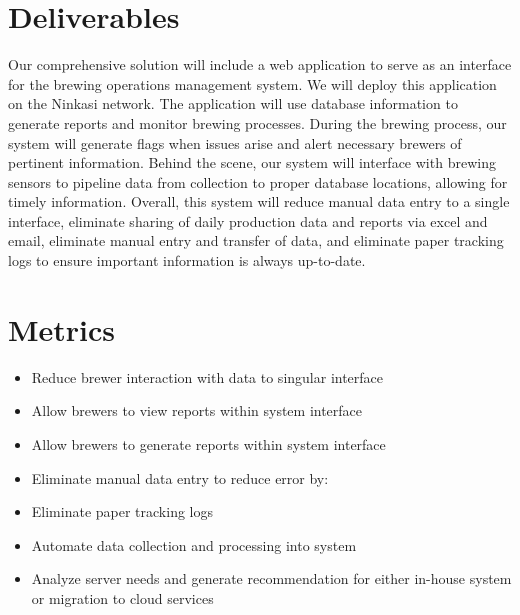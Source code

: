 \documentclass[draftclsnofoot,onecolumn,letterpaper,10pt]{IEEEtran}
\begin{document}
\section{\textbf{Deliverables}}
Our comprehensive solution will include a web application to serve as an interface for the brewing operations management system. We will deploy this application on the Ninkasi network. The application will use database information to generate reports and monitor brewing processes. During the brewing process, our system will generate flags when issues arise and alert necessary brewers of pertinent information. Behind the scene, our system will interface with brewing sensors to pipeline data from collection to proper database locations, allowing for timely information. Overall, this system will reduce manual data entry to a single interface, eliminate sharing of daily production data and reports via excel and email, eliminate manual entry and transfer of data, and eliminate paper tracking logs to ensure important information is always up-to-date.

\section{\textbf{Metrics}}
\begin{itemize}
\item {Reduce brewer interaction with data to singular interface}
\item {Allow brewers to view reports within system interface}
\item {Allow brewers to generate reports within system interface}
\item {Eliminate manual data entry to reduce error by:}
\item {Eliminate paper tracking logs}
\item {Automate data collection and processing into system}
\item {Analyze server needs and generate recommendation for either in-house system or migration to cloud services}
\end{itemize}
\end{document}

